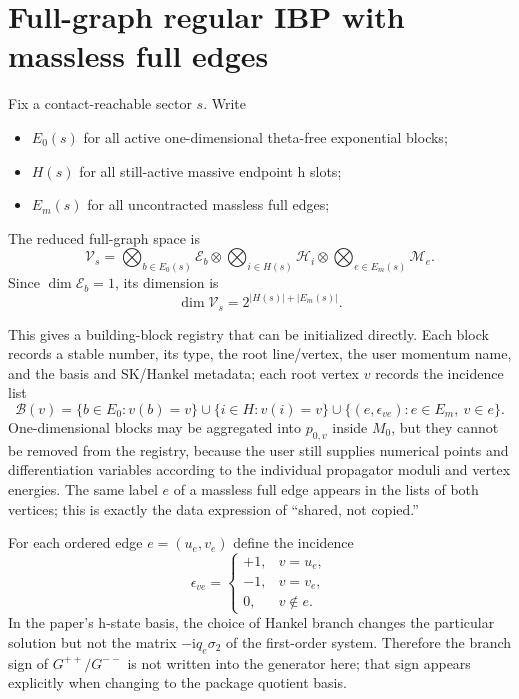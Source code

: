\documentclass[11pt,a4paper]{article}
\newcommand{\ii}{\mathrm i}
\newcommand{\cV}{\mathcal V}
\newcommand{\cE}{\mathcal E}
\newcommand{\cH}{\mathcal H}
\newcommand{\cM}{\mathcal M}
\newcommand{\cB}{\mathcal B}
\begin{document}
\section{Full-graph regular IBP with massless full edges}

Fix a contact-reachable sector $s$. Write
\begin{itemize}
  \item $E_0(s)$ for all active one-dimensional theta-free exponential blocks;
  \item $H(s)$ for all still-active massive endpoint h slots;
  \item $E_m(s)$ for all uncontracted massless full edges;
\end{itemize}
The reduced full-graph space is
\begin{equation}
 \boxed{
 \cV_s
 =\bigotimes_{b\in E_0(s)}\cE_b
 \otimes\bigotimes_{i\in H(s)}\cH_i
 \otimes\bigotimes_{e\in E_m(s)}\cM_e.
 }
 \label{eq:global-reduced-space}
\end{equation}
Since $\dim\cE_b=1$, its dimension is
\begin{equation}
 \dim\cV_s=2^{|H(s)|+|E_m(s)|}.
\end{equation}

This gives a building-block registry that can be initialized directly. Each block records a stable number, its type, the root line/vertex, the user momentum name, and the basis and SK/Hankel metadata; each root vertex $v$ records the incidence list
\begin{equation}
 \cB(v)=
 \{b\in E_0:v(b)=v\}
 \cup\{i\in H:v(i)=v\}
 \cup\{(e,\epsilon_{ve}):e\in E_m,\ v\in e\}.
 \label{eq:vertex-block-incidence}
\end{equation}
One-dimensional blocks may be aggregated into $p_{0,v}$ inside $M_0$, but they cannot be removed from the registry, because the user still supplies numerical points and differentiation variables according to the individual propagator moduli and vertex energies. The same label $e$ of a massless full edge appears in the lists of both vertices; this is exactly the data expression of ``shared, not copied.''

For each ordered edge $e=(u_e,v_e)$ define the incidence
\begin{equation}
 \epsilon_{ve}=
 \begin{cases}
 +1,&v=u_e,\\
 -1,&v=v_e,\\
 0,&v\notin e.
 \end{cases}
\end{equation}
In the paper's h-state basis, the choice of Hankel branch changes the particular solution but not the matrix $-\ii q_e\sigma_2$ of the first-order system. Therefore the branch sign of $G^{++}/G^{--}$ is not written into the generator here; that sign appears explicitly when changing to the package quotient basis.
\end{document}
